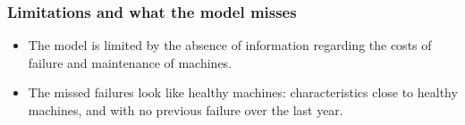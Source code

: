 \documentclass{beamer}
\begin{document}
    \begin{frame}
        \frametitle{Limitations and what the model misses}
        \begin{itemize}
            \item The model is limited by the absence of information regarding the costs 
                of failure and maintenance of machines.
            \item The missed failures look like healthy machines: characteristics 
            close to healthy machines, and with no previous failure over the last year.
        \end{itemize}
    \end{frame}
\end{document}
